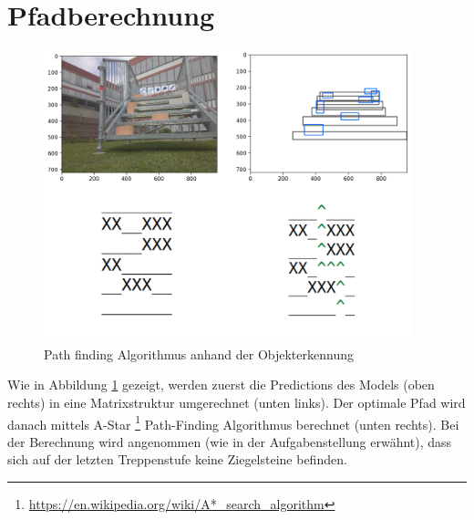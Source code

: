 
\section{Pfadberechnung}

\begin{figure}[H]
  \includegraphics[width=0.95\textwidth]{img/CNN/path-finding}
  \caption{Path finding Algorithmus anhand der Objekterkennung}
  \label{fig:path-finding}
\end{figure}

Wie in Abbildung \ref{fig:path-finding} gezeigt, werden zuerst die Predictions
des Models (oben rechts) in eine Matrixstruktur umgerechnet (unten links).
Der optimale Pfad wird danach mittels A-Star \footnote{\url{https://en.wikipedia.org/wiki/A*_search_algorithm}} Path-Finding
Algorithmus berechnet (unten rechts). Bei der Berechnung wird angenommen (wie in der Aufgabenstellung erwähnt),
dass sich auf der letzten Treppenstufe keine Ziegelsteine befinden.